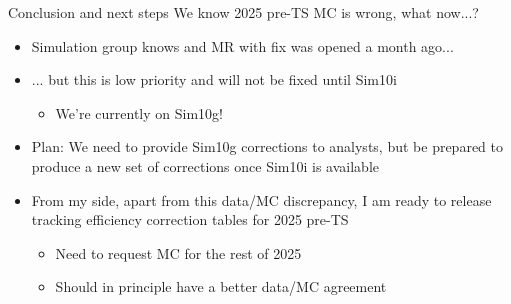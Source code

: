 \documentclass[xcolor={dvipsnames}]{beamer}
\begin{document}
\begin{frame}{Conclusion and next steps}
  \vspace{0.0cm}
  {\Large We know 2025 pre-TS MC is wrong, what now...?}
  \vspace{0.2cm}
  \begin{itemize}
    \setlength\itemsep{1.0em}
    \item{Simulation group knows and MR with fix was opened a month ago...}
    \item{... but this is low priority and will not be fixed until Sim10i}
    \begin{itemize}
      \item[-]{We're currently on Sim10g!}
    \end{itemize}
    \item{Plan: We need to provide Sim10g corrections to analysts, but be prepared to produce a new set of corrections once Sim10i is available}
    \item{From my side, apart from this data/MC discrepancy, I am ready to release tracking efficiency correction tables for 2025 pre-TS}
    \begin{itemize}
      \item[-]{Need to request MC for the rest of 2025}
      \item[-]{Should in principle have a better data/MC agreement}
    \end{itemize}
  \end{itemize}
\end{frame}
\end{document}
